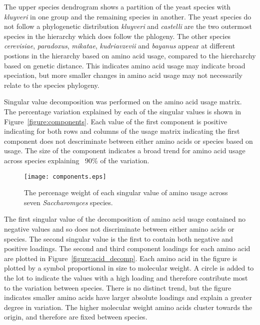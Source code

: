 The upper species dendrogram shows a partition of the yeast species with \emph{kluyveri} in one group and the remaining species in another. The yeast species do not follow a phylogenetic distribution \emph{kluyveri} and \emph{castelli} are the two outermost species in the hierarchy which does follow the phlogeny. The other species \emph{cerevisiae}, \emph{paradoxus}, \emph{mikatae}, \emph{kudriavzevii} and \emph{bayanus} appear at different postions in the hierarchy based on amino acid usage, compared to the hiercharchy based on genetic distance. This indicates amino acid usage may indicate broad speciation, but more smaller changes in amino acid usage may not necessarily relate to the species phylogeny.

Singular value decomposition was performed on the amino acid usage matrix. The percentage variation explained by each of the singular values is shown in Figure~\vref{figure:components}. Each value of the first component is positive indicating for both rows and columns of the usage matrix indicating the first component does not descriminate between either amino acids or species based on usage. The size of the component indicates a broad trend for amino acid usage across species explaining ~90\% of the variation.

\begin{figure}
  \centering
  \texttt{[image: components.eps]}
  \caption[Components of amino acid usage singular value decomposition]{The percenage weight of each singular value of amino usage across seven \emph{Saccharomyces} species.}
  \label{figure:components}
\end{figure}

The first singular value of the decomposition of amino acid usage contained no negative values and so does not discriminate between either amino acids or species. The second singular value is the first to contain both negative and positive loadings. The second and third component loadings for each amino acid are plotted in Figure~\vref{figure:acid_decomp}. Each amino acid in the figure is plotted by a symbol proportional in size to molecular weight. A circle is added to the lot to indicate the values with a high loading and therefore contribute most to the variation between species. There is no distinct trend, but the figure indicates smaller amino acids have larger absolute loadings and explain a greater degree in variation. The higher molecular weight amino acids cluster towards the origin, and therefore are fixed between species.

